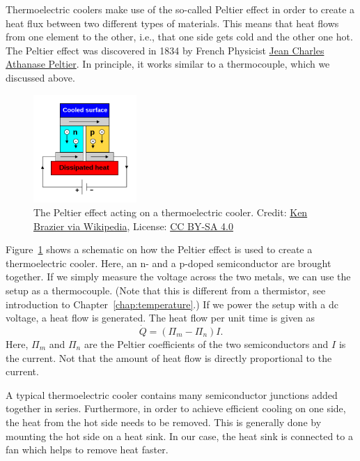 Thermoelectric coolers make use of the so-called Peltier effect in order to create a heat flux between two different types of materials. This means that heat flows from one element to the other, i.e., that one side gets cold and the other one hot. The Peltier effect was discovered in 1834 by French Physicist \href{https://en.wikipedia.org/wiki/Jean_Charles_Athanase_Peltier}{Jean Charles Athanase Peltier}. In principle, it works similar to a thermocouple, which we discussed above.
\begin{figure}[b!]
    \centering
    \includegraphics[width=0.35\textwidth]{graphics/04_peltier/peltier_cooler}
    \caption{The Peltier effect acting on a thermoelectric cooler. Credit: \href{https://en.wikipedia.org/wiki/File:Thermoelectric_Cooler_Diagram.svg}{Ken Brazier via Wikipedia}, License: \href{https://creativecommons.org/licenses/by-sa/4.0/}{CC BY-SA 4.0}}
    \label{fig:peltier:peltier}
\end{figure}
Figure~\ref{fig:peltier:peltier} shows a schematic on how the Peltier effect is used to create a thermoelectric cooler. Here, an n- and a p-doped semiconductor are brought together. If we simply measure the voltage across the two metals, we can use the setup as a thermocouple. (Note that this is different from a thermistor, see introduction to Chapter~\ref{chap:temperature}.) If we power the setup with a \ac{dc} voltage, a heat flow is generated. The heat flow per unit time is given as
\begin{equation}
    \dot{Q} = (\Pi_m - \Pi_n)I.
\end{equation}
Here, $\Pi_m$ and $\Pi_n$ are the Peltier coefficients of the two semiconductors and $I$ is the current. Not that the amount of heat flow is directly proportional to the current.

A typical thermoelectric cooler contains many semiconductor junctions added together in series. Furthermore, in order to achieve efficient cooling on one side, the heat from the hot side needs to be removed. This is generally done by mounting the hot side on a heat sink. In our case, the heat sink is connected to a fan which helps to remove heat faster.


